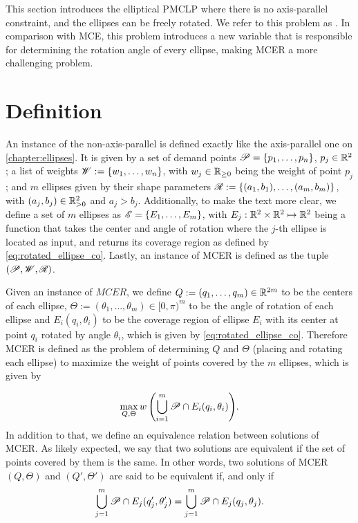 This section introduces the elliptical PMCLP where there is no axis-parallel constraint, and the ellipses can be freely rotated. We refer to this problem as . In comparison with MCE, this problem introduces a new variable that is responsible for determining the rotation angle of every ellipse, making MCER a more challenging problem.

\section{Definition}

An instance of the non-axis-parallel is defined exactly like the axis-parallel one on \autoref{chapter:ellipses}. It is given by a set of demand points $\mathscr{P}=\{p_1, \dots, p_n\}$, $p_j\in\mathbb{R}^2$; a list of weights $\mathscr{W}:=\{w_1, \dots, w_n\}$, with $w_j\in\mathbb{R}_{\ge0}$ being the weight of point $p_j$;
and $m$ ellipses given by their shape parameters $\mathscr{R}:=\{(a_1, b_1), \dots, (a_m, b_m)\}$, with $(a_j, b_j)\in\mathbb{R}_{>0}^2$ and $a_j>b_j$.
Additionally, to make the text more clear, we define a set of $m$ ellipses as $\mathscr{E} = \{E_1, \dots, E_m\}$, with $E_j : \mathbb{R}^2\times\mathbb{R}^2 \mapsto \mathbb{R}^2$ being a function that takes the center and angle of rotation where the $j$-th ellipse is located as input, and returns its coverage region as defined by \autoref{eq:rotated_ellipse_co}.
Lastly, an instance of MCER is defined as the tuple $(\mathscr{P}, \mathscr{W}, \mathscr{R})$.

Given an instance of $MCER$, we define $Q:=(q_1, \dots, q_m) \in \mathbb{R}^{2m}$ to be the centers of each ellipse, $\Theta:=(\theta_1, \dots, \theta_m) \in [0, \pi)^m$ to be the angle of rotation of each ellipse and $E_i(q_i, \theta_i)$ to be the coverage region of ellipse $E_i$ with its center at point $q_i$ rotated by angle $\theta_i$, which is given by \autoref{eq:rotated_ellipse_co}. Therefore MCER is defined as the problem of determining $Q$ and $\Theta$ (placing and rotating each ellipse) to maximize the weight of points covered by the $m$ ellipses, which is given by

\begin{equation}\label{eq:optMCEn}
\max_{Q, \Theta}{w\left(\bigcup_{i=1}^{m} \mathscr{P} \cap E_i(q_i, \theta_i)\right)}.
\end{equation}
In addition to that, we define an equivalence relation between solutions of MCER. As likely expected, we say that two solutions are equivalent if the set of points covered by them is the same. In other words, two solutions of MCER $(Q, \Theta)$ and $(Q', \Theta')$ are said to be equivalent if, and only if 
$$\bigcup_{j=1}^m\mathscr{P} \cap E_j(q_j', \theta_j') = \bigcup_{j=1}^m\mathscr{P} \cap E_j(q_j, \theta_j).$$

